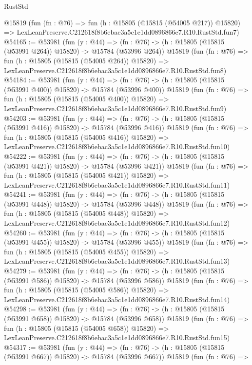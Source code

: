 \begin{lexlean}{RustStd}
\begin{coremodule}
    @15819
    (fun (fn : @76) =>
    fun (h : @15805 (@15815 (@54005 @217)) @15820) =>
    LexLeanPreserve.C212618f8b6ebac3a5c1e1dd0896866e7.R10.RustStd.fun7)
@54165 := @53981
    (fun (y : @44) =>
    (fn : @76) -> (h : @15805 (@15815 (@53991 @264)) @15820) -> @15784 (@53996 @264))
    @15819
    (fun (fn : @76) =>
    fun (h : @15805 (@15815 (@54005 @264)) @15820) =>
    LexLeanPreserve.C212618f8b6ebac3a5c1e1dd0896866e7.R10.RustStd.fun8)
@54184 := @53981
    (fun (y : @44) =>
    (fn : @76) -> (h : @15805 (@15815 (@53991 @400)) @15820) -> @15784 (@53996 @400))
    @15819
    (fun (fn : @76) =>
    fun (h : @15805 (@15815 (@54005 @400)) @15820) =>
    LexLeanPreserve.C212618f8b6ebac3a5c1e1dd0896866e7.R10.RustStd.fun9)
@54203 := @53981
    (fun (y : @44) =>
    (fn : @76) -> (h : @15805 (@15815 (@53991 @416)) @15820) -> @15784 (@53996 @416))
    @15819
    (fun (fn : @76) =>
    fun (h : @15805 (@15815 (@54005 @416)) @15820) =>
    LexLeanPreserve.C212618f8b6ebac3a5c1e1dd0896866e7.R10.RustStd.fun10)
@54222 := @53981
    (fun (y : @44) =>
    (fn : @76) -> (h : @15805 (@15815 (@53991 @421)) @15820) -> @15784 (@53996 @421))
    @15819
    (fun (fn : @76) =>
    fun (h : @15805 (@15815 (@54005 @421)) @15820) =>
    LexLeanPreserve.C212618f8b6ebac3a5c1e1dd0896866e7.R10.RustStd.fun11)
@54241 := @53981
    (fun (y : @44) =>
    (fn : @76) -> (h : @15805 (@15815 (@53991 @448)) @15820) -> @15784 (@53996 @448))
    @15819
    (fun (fn : @76) =>
    fun (h : @15805 (@15815 (@54005 @448)) @15820) =>
    LexLeanPreserve.C212618f8b6ebac3a5c1e1dd0896866e7.R10.RustStd.fun12)
@54260 := @53981
    (fun (y : @44) =>
    (fn : @76) -> (h : @15805 (@15815 (@53991 @455)) @15820) -> @15784 (@53996 @455))
    @15819
    (fun (fn : @76) =>
    fun (h : @15805 (@15815 (@54005 @455)) @15820) =>
    LexLeanPreserve.C212618f8b6ebac3a5c1e1dd0896866e7.R10.RustStd.fun13)
@54279 := @53981
    (fun (y : @44) =>
    (fn : @76) -> (h : @15805 (@15815 (@53991 @586)) @15820) -> @15784 (@53996 @586))
    @15819
    (fun (fn : @76) =>
    fun (h : @15805 (@15815 (@54005 @586)) @15820) =>
    LexLeanPreserve.C212618f8b6ebac3a5c1e1dd0896866e7.R10.RustStd.fun14)
@54298 := @53981
    (fun (y : @44) =>
    (fn : @76) -> (h : @15805 (@15815 (@53991 @658)) @15820) -> @15784 (@53996 @658))
    @15819
    (fun (fn : @76) =>
    fun (h : @15805 (@15815 (@54005 @658)) @15820) =>
    LexLeanPreserve.C212618f8b6ebac3a5c1e1dd0896866e7.R10.RustStd.fun15)
@54317 := @53981
    (fun (y : @44) =>
    (fn : @76) -> (h : @15805 (@15815 (@53991 @667)) @15820) -> @15784 (@53996 @667))
    @15819
    (fun (fn : @76) =>

\end{coremodule}
\end{lexlean}
